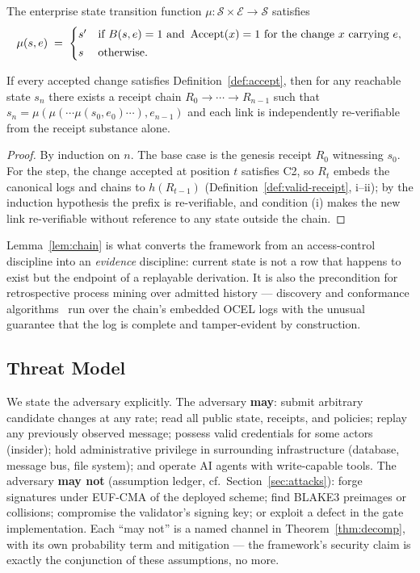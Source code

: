 \begin{definition}
\label{def:mu}
The enterprise state transition function $\mu : \mathcal{S} \times \mathcal{E}
\to \mathcal{S}$ satisfies
\[
  \mu(s, e) \;=\;
  \begin{cases}
    s' & \text{if } B(s,e) = 1 \text{ and } \operatorname{Accept}(x) = 1
         \text{ for the change } x \text{ carrying } e,\\[2pt]
    s  & \text{otherwise.}
  \end{cases}
\]
\end{definition}

\begin{lemma}
\label{lem:chain}
If every accepted change satisfies Definition~\ref{def:accept}, then for any
reachable state $s_n$ there exists a receipt chain
$R_0 \to \cdots \to R_{n-1}$ such that
$s_n = \mu(\mu(\cdots\mu(s_0, e_0)\cdots), e_{n-1})$ and each link is
independently re-verifiable from the receipt substance alone.
\end{lemma}
\begin{proof}
By induction on $n$. The base case is the genesis receipt $R_0$ witnessing
$s_0$. For the step, the change accepted at position $t$ satisfies C2, so
$R_t$ embeds the canonical logs and chains to $h(R_{t-1})$
(Definition~\ref{def:valid-receipt}, i--ii); by the induction hypothesis the
prefix is re-verifiable, and condition (i) makes the new link re-verifiable
without reference to any state outside the chain.
\end{proof}

Lemma~\ref{lem:chain} is what converts the framework from an access-control
discipline into an \emph{evidence} discipline: current state is not a row that
happens to exist but the endpoint of a replayable derivation. It is also the
precondition for retrospective process mining over admitted history ---
discovery and conformance algorithms~\cite{van_der_aalst_2016_process_mining}
run over the chain's embedded OCEL logs with the unusual guarantee that the log
is complete and tamper-evident by construction.

\subsection{Threat Model}
\label{sec:threat-model}

We state the adversary explicitly. The adversary \textbf{may}: submit arbitrary
candidate changes at any rate; read all public state, receipts, and policies;
replay any previously observed message; possess valid credentials for some
actors (insider); hold administrative privilege in surrounding infrastructure
(database, message bus, file system); and operate AI agents with write-capable
tools. The adversary \textbf{may not} (assumption ledger, cf.\
Section~\ref{sec:attacks}): forge signatures under EUF-CMA of the deployed
scheme; find BLAKE3 preimages or collisions; compromise the validator's signing
key; or exploit a defect in the gate implementation. Each ``may not'' is a
named channel in Theorem~\ref{thm:decomp}, with its own probability term and
mitigation --- the framework's security claim is exactly the conjunction of
these assumptions, no more.

